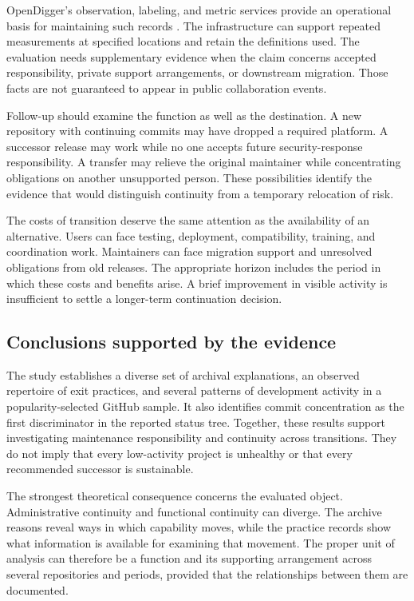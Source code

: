 OpenDigger's observation, labeling, and metric services provide an operational basis for maintaining such records \citep{wang2026digger}. The infrastructure can support repeated measurements at specified locations and retain the definitions used. The evaluation needs supplementary evidence when the claim concerns accepted responsibility, private support arrangements, or downstream migration. Those facts are not guaranteed to appear in public collaboration events.

Follow-up should examine the function as well as the destination. A new repository with continuing commits may have dropped a required platform. A successor release may work while no one accepts future security-response responsibility. A transfer may relieve the original maintainer while concentrating obligations on another unsupported person. These possibilities identify the evidence that would distinguish continuity from a temporary relocation of risk.

The costs of transition deserve the same attention as the availability of an alternative. Users can face testing, deployment, compatibility, training, and coordination work. Maintainers can face migration support and unresolved obligations from old releases. The appropriate horizon includes the period in which these costs and benefits arise. A brief improvement in visible activity is insufficient to settle a longer-term continuation decision.

\subsection{Conclusions supported by the evidence}
The study establishes a diverse set of archival explanations, an observed repertoire of exit practices, and several patterns of development activity in a popularity-selected GitHub sample. It also identifies commit concentration as the first discriminator in the reported status tree. Together, these results support investigating maintenance responsibility and continuity across transitions. They do not imply that every low-activity project is unhealthy or that every recommended successor is sustainable.

The strongest theoretical consequence concerns the evaluated object. Administrative continuity and functional continuity can diverge. The archive reasons reveal ways in which capability moves, while the practice records show what information is available for examining that movement. The proper unit of analysis can therefore be a function and its supporting arrangement across several repositories and periods, provided that the relationships between them are documented.

